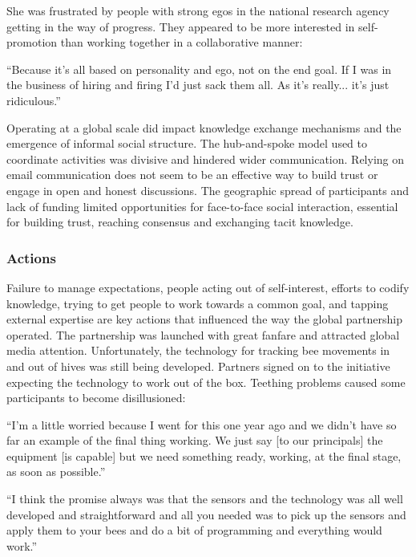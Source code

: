 She was frustrated by people with strong egos in the national research agency getting in the way of progress. They appeared to be more interested in self-promotion than working together in a collaborative manner: 

\begin{displayquote}[Participant 13/3]
\small
\enquote{Because it's all based on personality and ego, not on the end goal. If I was in the business of hiring and firing I'd just sack them all. As it's really... it's just ridiculous.} 
\end{displayquote}

Operating at a global scale did impact knowledge exchange mechanisms and the emergence of informal social structure. The hub-and-spoke model used to coordinate activities was divisive and hindered wider communication. Relying on email communication does not seem to be an effective way to build trust or engage in open and honest discussions. The geographic spread of participants and lack of funding limited opportunities for face-to-face social interaction, essential for building trust, reaching consensus and exchanging tacit knowledge. 

\subsubsection{Actions}

Failure to manage expectations, people acting out of self-interest, efforts to codify knowledge, trying to get people to work towards a common goal, and tapping external expertise are key actions that influenced the way the global partnership operated. The partnership was launched with great fanfare and attracted global media attention. Unfortunately, the technology for tracking bee movements in and out of hives was still being developed. Partners signed on to the initiative expecting the technology to work out of the box. Teething problems caused some participants to become disillusioned:

\begin{displayquote}[Participant 9/3]
\small
\enquote{I'm a little worried because I went for this one year ago and we didn't have so far an example of the final thing working. We just say [to our principals] the equipment [is capable] but we need something ready, working, at the final stage, as soon as possible.} 
\end{displayquote}

\begin{displayquote}[Participant 22/3]
\small
\enquote{I think the promise always was that the sensors and the technology was all well developed and straightforward and all you needed was to pick up the sensors and apply them to your bees and do a bit of programming and everything would work.} 
\end{displayquote}

